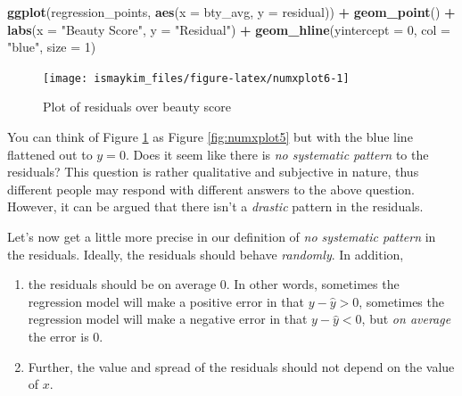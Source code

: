 \documentclass[12pt,]{krantz}
\makeatletter
\newenvironment{Shaded}{\begin{snugshade}}{\end{snugshade}}
\newcommand{\KeywordTok}[1]{\textcolor[rgb]{0.27,0.27,0.27}{\textbf{#1}}}
\newcommand{\DataTypeTok}[1]{\textcolor[rgb]{0.27,0.27,0.27}{#1}}
\newcommand{\DecValTok}[1]{\textcolor[rgb]{0.06,0.06,0.06}{#1}}
\newcommand{\StringTok}[1]{\textcolor[rgb]{0.5,0.5,0.5}{#1}}
\newcommand{\OperatorTok}[1]{\textcolor[rgb]{0.43,0.43,0.43}{\textbf{#1}}}
\newcommand{\NormalTok}[1]{#1}
\providecommand{\tightlist}{%
  \setlength{\itemsep}{0pt}\setlength{\parskip}{0pt}}
\newenvironment{kframe}{%
\medskip{}
\setlength{\fboxsep}{.8em}
 \def\at@end@of@kframe{}%
 \ifinner\ifhmode%
  \def\at@end@of@kframe{\end{minipage}}%
  \begin{minipage}{\columnwidth}%
 \fi\fi%
 \def\FrameCommand##1{\hskip\@totalleftmargin \hskip-\fboxsep
 \colorbox{shadecolor}{##1}\hskip-\fboxsep
     \hskip-\linewidth \hskip-\@totalleftmargin \hskip\columnwidth}%
 \MakeFramed {\advance\hsize-\width
   \@totalleftmargin\z@ \linewidth\hsize
   \@setminipage}}%
 {\par\unskip\endMakeFramed%
 \at@end@of@kframe}
\renewenvironment{Shaded}{\begin{kframe}}{\end{kframe}}
\makeatother
\begin{document}
\begin{Shaded}
\begin{Highlighting}[]
\KeywordTok{ggplot}\NormalTok{(regression_points, }\KeywordTok{aes}\NormalTok{(}\DataTypeTok{x =}\NormalTok{ bty_avg, }\DataTypeTok{y =}\NormalTok{ residual)) }\OperatorTok{+}
\StringTok{  }\KeywordTok{geom_point}\NormalTok{() }\OperatorTok{+}
\StringTok{  }\KeywordTok{labs}\NormalTok{(}\DataTypeTok{x =} \StringTok{"Beauty Score"}\NormalTok{, }\DataTypeTok{y =} \StringTok{"Residual"}\NormalTok{) }\OperatorTok{+}
\StringTok{  }\KeywordTok{geom_hline}\NormalTok{(}\DataTypeTok{yintercept =} \DecValTok{0}\NormalTok{, }\DataTypeTok{col =} \StringTok{"blue"}\NormalTok{, }\DataTypeTok{size =} \DecValTok{1}\NormalTok{)}
\end{Highlighting}
\end{Shaded}

\begin{figure}

{\centering \texttt{[image: ismaykim\_files/figure-latex/numxplot6-1]} 

}

\caption{Plot of residuals over beauty score}\label{fig:numxplot6}
\end{figure}

You can think of Figure \ref{fig:numxplot6} as Figure
\ref{fig:numxplot5} but with the blue line flattened out to \(y=0\).
Does it seem like there is \emph{no systematic pattern} to the
residuals? This question is rather qualitative and subjective in nature,
thus different people may respond with different answers to the above
question. However, it can be argued that there isn't a \emph{drastic}
pattern in the residuals.

Let's now get a little more precise in our definition of \emph{no
systematic pattern} in the residuals. Ideally, the residuals should
behave \emph{randomly}. In addition,

\begin{enumerate}
\def\labelenumi{\arabic{enumi}.}
\tightlist
\item
  the residuals should be on average 0. In other words, sometimes the
  regression model will make a positive error in that
  \(y - \widehat{y} > 0\), sometimes the regression model will make a
  negative error in that \(y - \widehat{y} < 0\), but \emph{on average}
  the error is 0.
\item
  Further, the value and spread of the residuals should not depend on
  the value of \(x\).
\end{enumerate}
\end{document}
